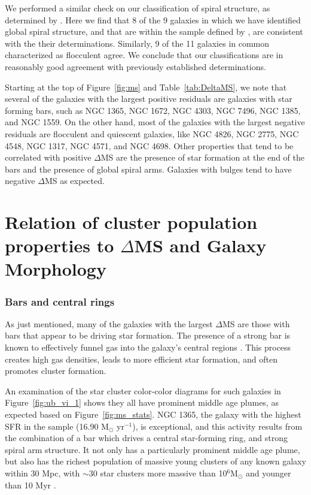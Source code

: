 \documentclass[linenumbers]{aastex63}
\begin{document}
{We performed a similar check on our classification of spiral structure, as determined by \citet{EE87}. Here we find that 8 of the 9 galaxies in which we have identified global spiral structure, and that are within the sample defined by \citet{EE87}, are consistent with the their determinations. Similarly, 9 of the 11 galaxies in common characterized as flocculent agree. We conclude that our classifications are in reasonably good agreement with previously established determinations.

Starting at the top of Figure~\ref{fig:ms} and Table~\ref{tab:DeltaMS}, we note that several of the galaxies with the largest positive residuals are galaxies with star forming bars, such as NGC 1365, NGC 1672, NGC 4303, NGC 7496, NGC 1385, and NGC 1559. On the other hand, most of the galaxies with the largest negative residuals are flocculent and quiescent galaxies, like NGC 4826, NGC 2775, NGC 4548, NGC 1317, NGC 4571, and NGC 4698.    
Other properties that tend to be correlated with positive $\Delta$MS are the presence of star formation at the end of the bars and the presence of global spiral arms. Galaxies with bulges tend to have negative $\Delta$MS as expected.

\section{Relation of cluster population properties to $\Delta$MS and Galaxy Morphology}

\subsubsection{Bars and central rings}

 As just mentioned, many of the galaxies with the largest $\Delta$MS are those with bars that appear to be driving star formation.  
 The presence of a strong bar is known to effectively funnel gas into the galaxy's central regions \citep[e.g.][]{athanassoula_existence_1992,sellwood_dynamics_1993,kuno_nobeyama_2007, sormani_fuelling_2023, schinnerer_phangs-jwst_2023}.  This process creates high gas densities, leads to more efficient star formation, and often promotes cluster formation. 

An examination of the star cluster color-color diagrams for such galaxies in Figure~\ref{fig:ub_vi_1} shows they all have prominent middle age plumes, as expected based on Figure~\ref{fig:ms_stats}. NGC 1365, the galaxy with the highest SFR in the sample (16.90 M$_{\odot}$ yr$^{-1}$), is exceptional, and this activity results from the combination of a bar which drives a central star-forming ring, and strong spiral arm structure.
 It not only has a particularly prominent middle age plume, but also has the richest population of massive young clusters of any known galaxy within 30 Mpc, with $\sim$30 star clusters more massive than 10$^6$M$_{\odot}$ and younger than 10 Myr \citep{whitmore_phangs-jwst_2023}.
 
}
\end{document}
